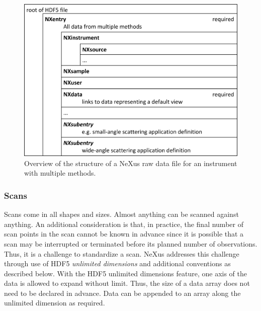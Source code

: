 \documentclass[%
 aip,
rsi,
 amsmath,amssymb,
 reprint,%
]{revtex4-1}
\begin{document}
\begin{figure}
\includegraphics[width=\columnwidth]{figure2}
\caption{\label{multimethod}Overview of the structure of a NeXus raw data file for an instrument with multiple methods.}
\end{figure}

\subsubsection{Scans}

Scans come in all shapes and sizes. Almost anything can be scanned against anything. 
An additional consideration is that, in practice, the final number of scan points in the scan 
cannot be known in advance since it is possible that a scan may be interrupted or terminated
before its planned number of observations. 
Thus, it is a challenge to standardize a scan.
NeXus addresses this challenge through use of HDF5 \emph{unlimited dimensions} and
additional conventions as described below.
With the HDF5 
unlimited dimensions feature, one axis of the data is allowed to expand without limit.  
Thus, the size of a data array does not need to be declared in advance. 
Data can be appended to an array along the unlimited dimension as required. 
\end{document}
